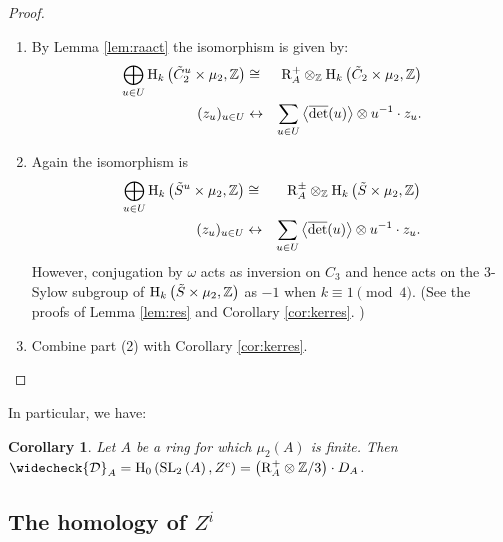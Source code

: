 \documentclass[12pt]{amsart}
\newtheorem{cor}[lem]{Corollary}
\theoremstyle{definition}
\newcommand{\Z}{\Bbb{Z}}
\newcommand{\spl}[2]{\operatorname{SL}_{#1}\left(#2\right)}
\newcommand{\cconst}[1]{D_{#1}}
\newcommand{\ccconstmod}[1]{\widecheck{\mathcal{D}}_{#1}}
\newcommand{\<}{\langle}
\renewcommand{\>}{\rangle}
\newcommand{\Ker}[1]{\mathrm{Ker}\left( #1\right)}
\newcommand{\sgr}[1]{\mathrm{R}_{#1}}%
\newcommand{\qsgr}[1]{\mathrm{R}^{+}_{#1}} %
\newcommand{\an}[1]{\left\langle{#1}\right\rangle}
\newcommand{\odet}{\overline{\mathrm{det}}}
\newcommand{\ho}[3]{\mathrm{H}_{#1}\left( #2,#3 \right)}
\newcommand{\Res}[2]{\mathrm{res}_{#1}^{#2}}
\begin{document}
\begin{proof}
\begin{enumerate}
\item By Lemma \ref{lem:raact} the isomorphism is given by:
\begin{eqnarray*}
\bigoplus_{u\in U}\ho{k}{\tilde{C}_2^u\times\mu_2}{\Z}&\cong&\qsgr{A}\otimes_{\Z}\ho{k}{\tilde{C}_2\times\mu_2}{\Z}\\
(z_u)_{u\in U}&\leftrightarrow&\sum_{u\in U}\an{\odet(u)}\otimes u^{-1}\cdot z_u.\\
\end{eqnarray*}
\item Again the isomorphism is 
\begin{eqnarray*}
\bigoplus_{u\in U}\ho{k}{\tilde{S}^u\times\mu_2}{\Z}&\cong&\sgr{A}^{\pm}\otimes_{\Z}\ho{k}{\tilde{S}\times\mu_2}{\Z}\\
(z_u)_{u\in U}&\leftrightarrow&\sum_{u\in U}\an{\odet(u)}\otimes u^{-1}\cdot z_u.\\
\end{eqnarray*}
However, conjugation by $\omega$ acts as inversion on $C_3$ and hence acts on the $3$-Sylow subgroup of $\ho{k}{\tilde{S}\times\mu_2}{\Z}$ as $-1$ when $k\equiv 1\pmod{4}$. (See the proofs of Lemma \ref{lem:res} and Corollary \ref{cor:kerres}. )
\item  Combine part (2) with  Corollary \ref{cor:kerres}.
\end{enumerate}
\end{proof}

In particular, we have:
\begin{cor}\label{cor:ccconstmod}  Let $A$ be a ring for which $\mu_2(A)$ is finite. Then 
$\ccconstmod{A}=\ho{0}{\spl{2}{A}}{Z^c}=\left(\qsgr{A}\otimes\Z/3\right)\cdot\cconst{A}$.
\end{cor}
\subsection{The homology of $Z^i$}
\end{document}
